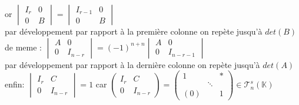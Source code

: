 \documentclass{article}
\begin{document}
  or $\begin{vmatrix} I_r & 0 \\ 0 & B \end{vmatrix}= \begin{vmatrix} I_{r-1} & 0 \\ 0  & B\end{vmatrix}$\\
    par développement par rapport à la première colonne on repète jusqu'à $det(B)$ \\
    de meme : $\begin{vmatrix} A & 0 \\ 0 & I_{n-r} \end{vmatrix}= (-1)^{n+n} \begin{vmatrix} A & 0 \\ 0 & I_{n-r-1} \end{vmatrix}$ \\
      par développement par rapport à la dernière colonne on repète jusqu'à $det(A)$ \\
      enfin: $\begin{vmatrix} I_r& C \\ 0 & I_{n-r} \end{vmatrix}=1$ car $\begin{pmatrix} I_r & C \\ 0 & I_{n-r} \end{pmatrix}= \begin{pmatrix} 1& & \ast \\  & \ddots \\ (0) & & 1 \end{pmatrix} \in \mathcal T^s_n(\mathbb K)$
\end{document}
